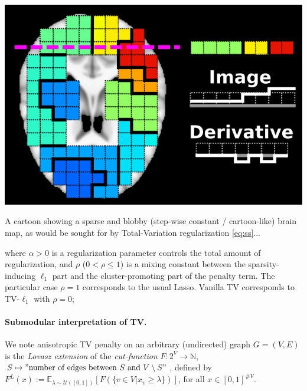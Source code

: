 \begin{marginfigure}[4cm]
  \includegraphics[width=1\linewidth]{figures/tv_cartoon_horizontal.png}
  \caption{A cartoon showing a sparse and blobby (step-wise constant / cartoon-like) brain map,
  as would be sought for by Total-Variation regularization \eqref{eq:ss}...}
  \label{fig:roi}
\end{marginfigure}
where $\alpha > 0$ is a regularization parameter controls the total amount of regularization, and
$\rho$ ($0 < \rho \le 1$) is a mixing constant between
  the {sparsity-inducing} $\ell_1$ part and the
  {cluster-promoting} part of the penalty term.
  The particular case {$\rho = 1$} corresponds to the usual Lasso. Vanilla TV   \citep{michel2011tv} corresponds to TV-$\ell_1$ with $\rho = 0$;

\begin{mdframed}
  \paragraph{Submodular interpretation of TV.} We note anisotropic TV penalty on
  an arbitrary (undirected) graph $G = (V,E)$ is the \textit{Lovasz extension} of the \textit{cut-function}
  $F : 2^V \rightarrow \mathbb N$, $S \mapsto "\text{number of edges between } S \text{ and }V\setminus S"$,
defined by $F^L(x) := \mathbb E_{\lambda \sim \mathcal U([0,1])}[F(\{v \in V|x_v \ge \lambda\})]$, for all $x \in [0,1]^{\#V}$.
\end{mdframed}

